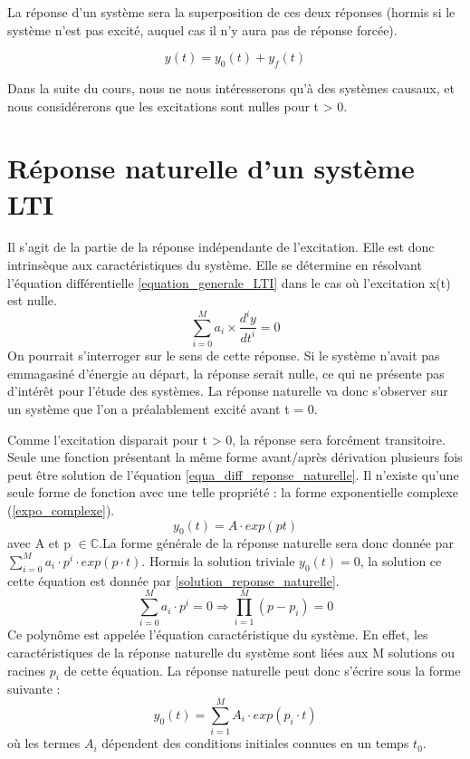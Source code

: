 \documentclass[]{book}
\begin{document}
{	La réponse d'un système sera la superposition de ces deux réponses (hormis si le système n'est pas excité, auquel cas il n'y aura pas de réponse forcée).
	
	\begin{equation}
	y(t) = y_{0}(t)+y_{f}(t)
	\end{equation}
	
	Dans la suite du cours, nous ne nous intéresserons qu'à des systèmes causaux,  et nous considérerons que les excitations sont nulles pour t > 0.
	
	\section{Réponse naturelle d'un système LTI}
	Il s'agit de la partie de la réponse indépendante de l'excitation. Elle est donc intrinsèque aux caractéristiques du système. Elle se détermine en résolvant l'équation différentielle \ref{equation_generale_LTI} dans le cas où l'excitation x(t) est nulle.
	\begin{equation}\label{equa_diff_reponse_naturelle}
	\sum_{i=0}^M a_{i}\times \frac{d^{i}y}{dt^{i}} = 0
	\end{equation}
	On pourrait s'interroger sur le sens de cette réponse. Si le système n'avait pas emmagasiné d'énergie au départ, la réponse serait nulle, ce qui ne présente pas d'intérêt pour l'étude des systèmes. La réponse naturelle va donc s'observer sur un système que l'on a préalablement excité avant t = 0.  
	
	Comme l'excitation disparait pour t > 0, la réponse sera forcément transitoire. Seule une fonction présentant la même forme avant/après dérivation plusieurs fois peut être solution de l'équation \ref{equa_diff_reponse_naturelle}. Il n'existe qu'une seule forme de fonction avec une telle propriété : la forme exponentielle complexe (\ref{expo_complexe}).
	\begin{equation}\label{expo_complexe}
	y_{0}(t) = A \cdot exp(p t)       
	\end{equation}
	avec A et p $\in \mathbb{C}$.La forme générale de la réponse naturelle sera donc donnée par $ \sum_{i=0}^M a_{i}\cdot p^{i} \cdot exp(p \cdot t) $. Hormis la solution triviale $y_{0}(t) = 0$, la solution ce cette équation est donnée par \ref{solution_reponse_naturelle}.
	\begin{equation} \label{solution_reponse_naturelle}
	\sum_{i=0}^M a_{i}\cdot p^{i} = 0 \Rightarrow \prod_{i=1}^{M} (p-p_{i}) = 0     
	\end{equation}	
	Ce polynôme est appelée l'équation caractéristique du système. En effet, les caractéristiques de la réponse naturelle du système sont liées aux M solutions ou racines $p_{i}$ de cette équation. La réponse naturelle peut donc s'écrire sous la forme suivante :
	\begin{equation}\label{reponse_naturelle}
	y_{0}(t) = \sum_{i=1}^M A_{i}\cdot exp(p_{i} \cdot t) 
	\end{equation}
	où les termes $A_{i}$ dépendent des conditions initiales connues en un temps $ t_{0}$.
	
}
\end{document}
